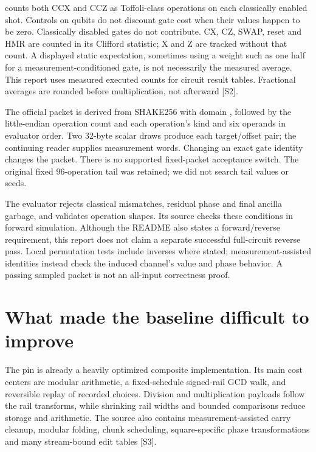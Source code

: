 \documentclass[11pt,letterpaper]{article}
\begin{document}
 counts both CCX and CCZ as Toffoli-class operations on each classically enabled shot. Controls on qubits do not discount gate cost when their values happen to be zero. Classically disabled gates do not contribute. CX, CZ, SWAP, reset and HMR are counted in its Clifford statistic; X and Z are tracked without that count. A displayed static expectation, sometimes using a weight such as one half for a measurement-conditioned gate, is not necessarily the measured average. This report uses measured executed counts for circuit result tables. Fractional averages are rounded before multiplication, not afterward [S2].


The official packet is derived from SHAKE256 with domain , followed by the little-endian operation count and each operation's kind and six operands in evaluator order. Two 32-byte scalar draws produce each target/offset pair; the continuing reader supplies measurement words. Changing an exact gate identity changes the packet. There is no supported fixed-packet acceptance switch. The original fixed 96-operation tail was retained; we did not search tail values or seeds.


The evaluator rejects classical mismatches, residual phase and final ancilla garbage, and validates operation shapes. Its source checks these conditions in forward simulation. Although the README also states a forward/reverse requirement, this report does not claim a separate successful full-circuit reverse pass. Local permutation tests include inverses where stated; measurement-assisted identities instead check the induced channel's value and phase behavior. A passing sampled packet is not an all-input correctness proof.


\section{What made the baseline difficult to improve}

The pin is already a heavily optimized composite implementation. Its main cost centers are modular arithmetic, a fixed-schedule signed-rail GCD walk, and reversible replay of recorded choices. Division and multiplication payloads follow the rail transforms, while shrinking rail widths and bounded comparisons reduce storage and arithmetic. The source also contains measurement-assisted carry cleanup, modular folding, chunk scheduling, square-specific phase transformations and many stream-bound edit tables [S3].
\end{document}
